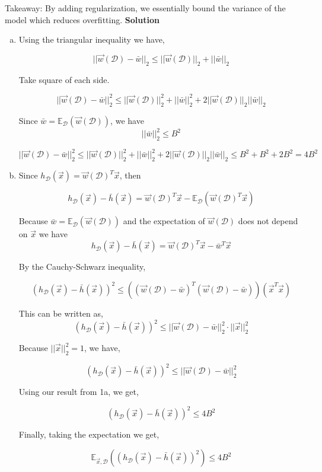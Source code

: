 \documentclass{article}
\begin{document}
    Takeaway: By adding regularization, we essentially bound the variance of the model which reduces overfitting.
    \newline 
    \newline
    \textbf{Solution} 
    \begin{enumerate}[(a)]
        \item Using the triangular inequality we have,

        $$||\vec{w}(\mathcal{D}) - \bar{w}||_2 \leq ||\vec{w}(\mathcal{D})||_2 + ||\bar{w}||_2$$

        Take square of each side.

        $$||\vec{w}(\mathcal{D}) - \bar{w}||_2^2 \leq ||\vec{w}(\mathcal{D})||_2^2 + ||\bar{w}||_2^2 + 2||\vec{w}(\mathcal{D})||_2||\bar{w}||_2$$

        Since $ \bar{w} = \mathbb{E}_{\mathcal{D}}(\vec{w}(\mathcal{D}))$, we have $$||\bar{w}||_2^2 \leq B^2$$

        $$||\vec{w}(\mathcal{D}) - \bar{w}||_2^2 \leq ||\vec{w}(\mathcal{D})||_2^2 + ||\bar{w}||_2^2 + 2||\vec{w}(\mathcal{D})||_2||\bar{w}||_2 \leq B^2 + B^2 + 2B^2 = 4B^2$$

        \item Since $h_\mathcal{D}(\vec{x}) = \vec{w}(\mathcal{D}) ^T \vec{x}$, then

        $$h_\mathcal{D}(\vec{x}) - \bar{h}(\vec{x}) = \vec{w}(\mathcal{D}) ^T \vec{x} -\mathbb{E}_{\mathcal{D}} (\vec{w}(\mathcal{D})^T\vec{x})  $$

        Because $\bar{w} = \mathbb{E}_{\mathcal{D}}(\vec{w}(\mathcal{D}))$ and the expectation of $\vec{w}(\mathcal{D})$ does not depend on $\vec{x}$ we have
        $$h_\mathcal{D}(\vec{x}) - \bar{h}(\vec{x}) = \vec{w}(\mathcal{D}) ^T \vec{x} - \bar{w}^T\vec{x}$$

        By the Cauchy-Schwarz inequality,

        $$(h_\mathcal{D}(\vec{x}) - \bar{h}(\vec{x})) ^ 2 \leq  ((\vec{w}(\mathcal{D}) - \bar{w}) ^T (\vec{w}(\mathcal{D}) - \bar{w}))(\vec{x}^T\vec{x})$$

        This can be written as,
        $$(h_\mathcal{D}(\vec{x}) - \bar{h}(\vec{x})) ^ 2 \leq  ||\vec{w}(\mathcal{D}) - \bar{w}||_2^2 \cdot ||\vec{x}||_2^2$$

        Because $||\vec{x}||_2^2 = 1$, we have,

        $$(h_\mathcal{D}(\vec{x}) - \bar{h}(\vec{x})) ^ 2 \leq  ||\vec{w}(\mathcal{D}) - \bar{w}||_2^2$$

        Using our result from 1a, we get,

        $$(h_\mathcal{D}(\vec{x}) - \bar{h}(\vec{x})) ^ 2 \leq 4B^2 $$

        Finally, taking the expectation we get,

        $$\mathbb{E}_{\vec{x}, \mathcal{D}}((h_\mathcal{D}(\vec{x}) - \bar{h}(\vec{x})) ^ 2) \leq 4B^2$$
    \end{enumerate}
\end{document}

